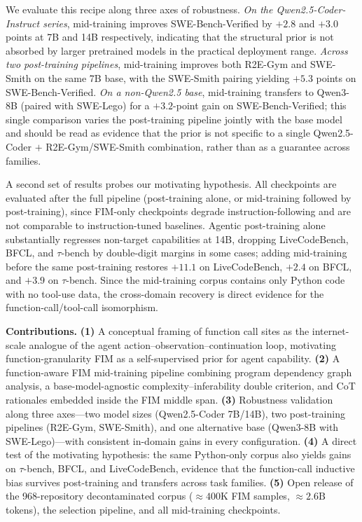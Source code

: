 We evaluate this recipe along three axes of robustness. \emph{On the
Qwen2.5-Coder-Instruct series}, mid-training improves SWE-Bench-Verified
by $+2.8$ and $+3.0$ points at 7B and 14B respectively, indicating that
the structural prior is not absorbed by larger pretrained models in the
practical deployment range. \emph{Across two post-training pipelines},
mid-training improves both R2E-Gym and SWE-Smith on the same 7B base,
with the SWE-Smith pairing yielding $+5.3$ points on SWE-Bench-Verified.
\emph{On a non-Qwen2.5 base}, mid-training transfers to Qwen3-8B (paired
with SWE-Lego) for a $+3.2$-point gain on SWE-Bench-Verified; this single
comparison varies the post-training pipeline jointly with the base model
and should be read as evidence that the prior is not specific to a single
Qwen2.5-Coder $+$ R2E-Gym/SWE-Smith combination, rather than as a
guarantee across families.

A second set of results probes our motivating hypothesis. All checkpoints
are evaluated after the full pipeline (post-training alone, or
mid-training followed by post-training), since FIM-only checkpoints
degrade instruction-following and are not comparable to instruction-tuned
baselines. Agentic post-training alone substantially regresses non-target
capabilities at 14B, dropping LiveCodeBench, BFCL, and $\tau$-bench by
double-digit margins in some cases; adding mid-training before the same
post-training restores $+11.1$ on LiveCodeBench, $+2.4$ on BFCL, and
$+3.9$ on $\tau$-bench. Since the mid-training corpus contains only
Python code with no tool-use data, the cross-domain recovery is direct
evidence for the function-call/tool-call isomorphism.

\textbf{Contributions.}
\textbf{(1)} A conceptual framing of function call sites as the
internet-scale analogue of the agent
action--observation--continuation loop, motivating function-granularity
FIM as a self-supervised prior for agent capability.
\textbf{(2)} A function-aware FIM mid-training pipeline combining program
dependency graph analysis, a base-model-agnostic
complexity--inferability double criterion, and CoT rationales embedded
inside the FIM middle span.
\textbf{(3)} Robustness validation along three axes---two model sizes
(Qwen2.5-Coder 7B/14B), two post-training pipelines (R2E-Gym, SWE-Smith),
and one alternative base (Qwen3-8B with SWE-Lego)---with consistent
in-domain gains in every configuration.
\textbf{(4)} A direct test of the motivating hypothesis: the same
Python-only corpus also yields gains on $\tau$-bench, BFCL, and
LiveCodeBench, evidence that the function-call inductive bias survives
post-training and transfers across task families.
\textbf{(5)} Open release of the 968-repository decontaminated corpus
($\approx\!400\mathrm{K}$ FIM samples, $\approx\!2.6\mathrm{B}$ tokens),
the selection pipeline, and all mid-training checkpoints.